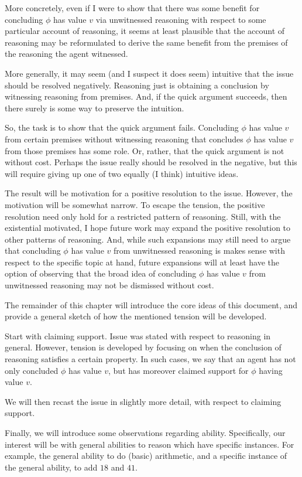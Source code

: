 \begin{note}
  More concretely, even if I were to show that there was some benefit for concluding \(\phi\) has value \(v\) via unwitnessed reasoning with respect to some particular account of reasoning, it seems at least plausible that the account of reasoning may be reformulated to derive the same benefit from the premises of the reasoning the agent witnessed.

  More generally, it may seem (and I suspect it does seem) intuitive that the issue should be resolved negatively.
  Reasoning just is obtaining a conclusion by witnessing reasoning from premises.
  And, if the quick argument succeeds, then there surely is some way to preserve the intuition.

  So, the task is to show that the quick argument fails.
  Concluding \(\phi\) has value \(v\) from certain premises without witnessing reasoning that concludes \(\phi\) has value \(v\) from those premises has some role.
  Or, rather, that the quick argument is not without cost.
  Perhaps the issue really should be resolved in the negative, but this will require giving up one of two equally (I think) intuitive ideas.

  The result will be motivation for a positive resolution to the issue.
  However, the motivation will be somewhat narrow.
  To escape the tension, the positive resolution need only hold for a restricted pattern of reasoning.
  Still, with the existential motivated, I hope future work may expand the positive resolution to other patterns of reasoning.
  And, while such expansions may still need to argue that concluding \(\phi\) has value \(v\) from unwitnessed reasoning is makes sense with respect to the specific topic at hand, future expansions will at least have the option of observing that the broad idea of concluding \(\phi\) has value \(v\) from unwitnessed reasoning may not be dismissed without cost.
\end{note}

\begin{note}
  The remainder of this chapter will introduce the core ideas of this document, and provide a general sketch of how the mentioned tension will be developed.
\end{note}

\begin{note}
  Start with claiming support.
  Issue was stated with respect to reasoning in general.
  However, tension is developed by focusing on when the conclusion of reasoning satisfies a certain property.
  In such cases, we say that an agent has not only concluded \(\phi\) has value \(v\), but has moreover claimed support for \(\phi\) having value \(v\).

  We will then recast the issue in slightly more detail, with respect to claiming support.

  Finally, we will introduce some observations regarding ability.
  Specifically, our interest will be with general abilities to reason which have specific instances.
  For example, the general ability to do (basic) arithmetic, and a specific instance of the general ability, to add \(18\) and \(41\).
\end{note}

